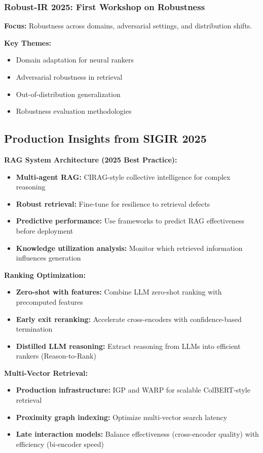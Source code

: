 \documentclass[11pt,letterpaper]{article}
\begin{document}
\subsubsection{Robust-IR 2025: First Workshop on Robustness}

\textbf{Focus:} Robustness across domains, adversarial settings, and distribution shifts.

\textbf{Key Themes:}
\begin{itemize}[leftmargin=*]
    \item Domain adaptation for neural rankers
    \item Adversarial robustness in retrieval
    \item Out-of-distribution generalization
    \item Robustness evaluation methodologies
\end{itemize}

\subsection{Production Insights from SIGIR 2025}

\textbf{RAG System Architecture (2025 Best Practice):}
\begin{itemize}[leftmargin=*]
    \item \textbf{Multi-agent RAG:} CIRAG-style collective intelligence for complex reasoning
    \item \textbf{Robust retrieval:} Fine-tune for resilience to retrieval defects
    \item \textbf{Predictive performance:} Use frameworks to predict RAG effectiveness before deployment
    \item \textbf{Knowledge utilization analysis:} Monitor which retrieved information influences generation
\end{itemize}

\textbf{Ranking Optimization:}
\begin{itemize}[leftmargin=*]
    \item \textbf{Zero-shot with features:} Combine LLM zero-shot ranking with precomputed features
    \item \textbf{Early exit reranking:} Accelerate cross-encoders with confidence-based termination
    \item \textbf{Distilled LLM reasoning:} Extract reasoning from LLMs into efficient rankers (Reason-to-Rank)
\end{itemize}

\textbf{Multi-Vector Retrieval:}
\begin{itemize}[leftmargin=*]
    \item \textbf{Production infrastructure:} IGP and WARP for scalable ColBERT-style retrieval
    \item \textbf{Proximity graph indexing:} Optimize multi-vector search latency
    \item \textbf{Late interaction models:} Balance effectiveness (cross-encoder quality) with efficiency (bi-encoder speed)
\end{itemize}
\end{document}
